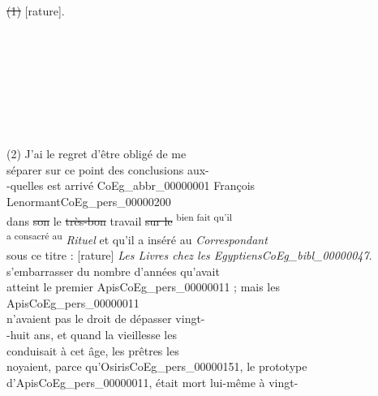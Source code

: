 \documentclass{book}
\begin{document}
{\begin{paracol}{2}
\noindent \\
\\
\\
\\
\\
\\
\\
\\
\\
\\
\\
\\
\\
\\
\\
\\
\\
\\
\\
\\
\sout{(1)} [rature].\\
\\
\\
\\
\\
\\
\\
\\
\\
(2) J’ai le regret d’être obligé de me\\
séparer sur ce point des conclusions aux-\\
-quelles est arrivé \gls{CoEg_abbr_00000001} François Lenormant\gls{CoEg_pers_00000200}\\
dans \sout{son} le \sout{très-bon} travail \sout{sur le} \textsuperscript{bien fait qu’il}\\
\textsuperscript{a consacré au} \textit{Rituel} et qu’il a inséré au \textit{Correspondant}\\
sous ce titre : [rature] \textit{Les Livres chez les Egyptiens\gls{CoEg_bibl_00000047}}.
\switchcolumn
\noindent s’embarrasser du nombre d’années qu’avait\\
atteint le premier Apis\gls{CoEg_pers_00000011} ; mais les Apis\gls{CoEg_pers_00000011}\\
n’avaient pas le droit de dépasser vingt-\\
-huit ans, et quand la vieillesse les\\
conduisait à cet âge, les prêtres les\\
noyaient, parce qu’Osiris\gls{CoEg_pers_00000151}, le prototype\\
d’Apis\gls{CoEg_pers_00000011}, était mort lui-même à vingt-\\

\end{paracol}}
\end{document}
